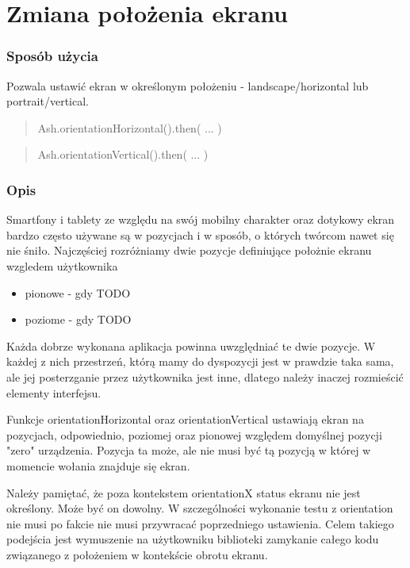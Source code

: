 \documentclass[brudnopis]{xmgr}
\begin{document}
\section{Zmiana położenia ekranu}

\subsubsection{Sposób użycia}
Pozwala ustawić ekran w określonym położeniu - landscape/horizontal lub portrait/vertical.

\begin{quote}
Ash.orientationHorizontal().then( ... ) 
\end{quote}

\begin{quote}
Ash.orientationVertical().then( ... ) 
\end{quote}

\subsubsection{Opis}

Smartfony i tablety ze względu na swój mobilny charakter oraz dotykowy ekran bardzo często używane są w pozycjach i w sposób, o których twórcom nawet się nie śniło. Najczęściej rozróżniamy dwie pozycje definiujące położnie ekranu wzgledem użytkownika 

\begin{itemize}
  \item pionowe - gdy  TODO
  \item poziome - gdy TODO
\end{itemize}

Każda dobrze wykonana aplikacja powinna uwzględniać te dwie pozycje. W każdej z nich przestrzeń, którą mamy do dyspozycji jest w prawdzie taka sama, ale jej posterzganie przez użytkownika jest inne, dlatego należy inaczej rozmieścić elementy interfejsu.  

Funkcje orientationHorizontal oraz orientationVertical  ustawiają ekran na pozycjach, odpowiednio, poziomej oraz pionowej względem domyślnej pozycji "zero" urządzenia. Pozycja ta może, ale nie musi być tą pozycją w której w momencie wołania znajduje się ekran.  

Należy pamiętać, że poza kontekstem orientationX status ekranu nie jest określony. Może być on dowolny. W szczególności wykonanie testu z orientation nie musi po fakcie nie musi przywracać poprzedniego ustawienia. Celem takiego podejścia jest wymuszenie na użytkowniku biblioteki zamykanie całego kodu związanego z położeniem w kontekście obrotu ekranu. 
\end{document}
